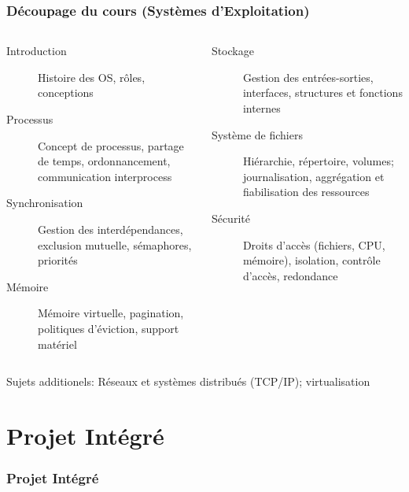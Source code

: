 \documentclass[compress,aspectratio=169]{beamer}
\begin{document}
\begin{frame}
  \frametitle{D\'ecoupage du cours (Syst\`emes d'Exploitation)}

  \begin{columns}
    \begin{column}{.45\linewidth}
      \begin{description}
      \item[Introduction] {\footnotesize Histoire des OS, r\^oles, conceptions}
      \item[Processus] {\footnotesize Concept de processus, partage de temps, ordonnancement, communication interprocess}
      \item[Synchronisation] {\footnotesize Gestion des interd\'ependances, exclusion mutuelle, s\'emaphores, priorit\'es}
      \item[M\'emoire] {\footnotesize M\'emoire virtuelle, pagination, politiques d'\'eviction, support mat\'eriel}
      \end{description}
    \end{column}\begin{column}{.45\linewidth}
      \begin{description}
      \item[Stockage] {\footnotesize Gestion des entr\'ees-sorties, interfaces, structures et fonctions internes}
      \item[Syst\`eme de fichiers] {\footnotesize Hi\'erarchie, r\'epertoire, volumes; journalisation, aggr\'egation et fiabilisation des ressources}
      \item[S\'ecurit\'e] {\footnotesize Droits d'acc\`es (fichiers, CPU, m\'emoire), isolation, contr\^ole d'acc\`es, redondance}
      \end{description}
    \end{column}
  \end{columns}

  \smallskip
  
  Sujets additionels: R\'eseaux et syst\`emes distribu\'es (TCP/IP); virtualisation
\end{frame}
  
\section{Projet Int\'egr\'e}

\begin{frame}
  \frametitle{Projet Int\'egr\'e}

\end{frame}
\end{document}
